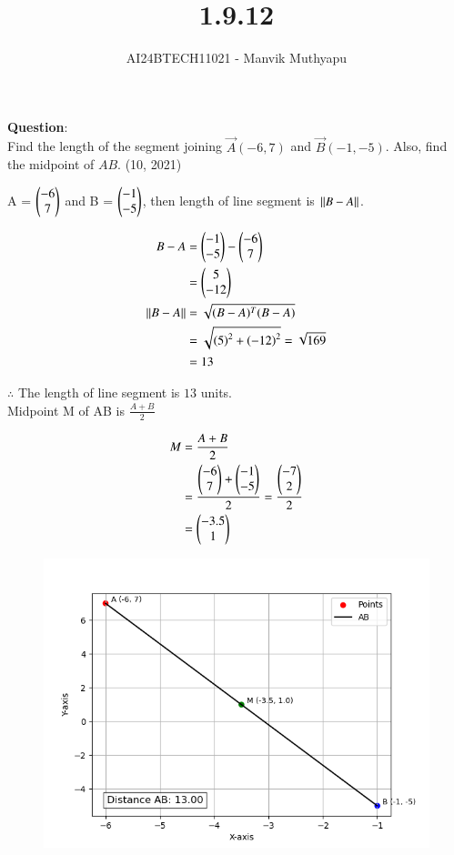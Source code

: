 \documentclass[journal,12pt,onecolumn]{IEEEtran}
\title{1.9.12}
\author{AI24BTECH11021 - Manvik Muthyapu}
\theoremstyle{remark}
\begin{document}


\maketitle
\bigskip

\renewcommand{\thefigure}{\theenumi}
\renewcommand{\thetable}{\theenumi}


\textbf{Question}:\\

Find the length of the segment joining $\vec{A}(-6, 7)$ and $\vec{B}(-1, -5)$. Also, find the midpoint of $AB$.
\hfill (10, 2021)\\

\solution

A = $\begin{pmatrix}-6\\7\end{pmatrix}$ and B = $\begin{pmatrix}-1\\-5\end{pmatrix}$, then length of line segment is $\left\lVert B-A\right\rVert$.

\begin{align}
	B-A &= \begin{pmatrix}-1\\-5\end{pmatrix}-\begin{pmatrix}-6\\7\end{pmatrix}\\
            &= \begin{pmatrix}5\\-12\end{pmatrix}\\
	\left\lVert B-A\right\rVert &= \sqrt{(B-A)^T(B-A)}\\
	&=\sqrt{\left(5\right)^2 + \left(-12\right)^2} = \sqrt{169}\\
	    &= 13
\end{align}

$\therefore$ The length of line segment is $13$ units.\\

Midpoint M of AB is $\frac{A+B}{2}$

\begin{align}
	M &= \frac{A+B}{2}\\
	  &= \frac{\begin{pmatrix}-6\\7\end{pmatrix} + \begin{pmatrix}-1\\-5\end{pmatrix}}{2} = \frac{\begin{pmatrix}-7\\2\end{pmatrix}}{2}\\
	  &= \begin{pmatrix}-3.5\\1\end{pmatrix}
\end{align}


\begin{figure}[h!]
	\centering
	\includegraphics[width=0.7\linewidth]{figs/fig1.png}
\end{figure}
\end{document}
